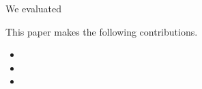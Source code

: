 We evaluated \tool {}

This paper makes the following contributions.

\begin{itemize}
\item 
\item
\item
\end{itemize}










